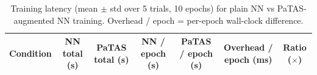 \begin{table}[ht]
\centering
\caption{Training latency (mean $\pm$ std over 5 trials, 10 epochs) for plain NN vs PaTAS-augmented NN training. Overhead / epoch = per-epoch wall-clock difference.}
\label{tab:latency-training}
\begin{tabular}{lcccccc}
\toprule
Condition & NN total (s) & PaTAS total (s) & NN / epoch (s) & PaTAS / epoch (s) & Overhead / epoch (ms) & Ratio ($\times$) \\
\midrule
\bottomrule
\end{tabular}
\end{table}